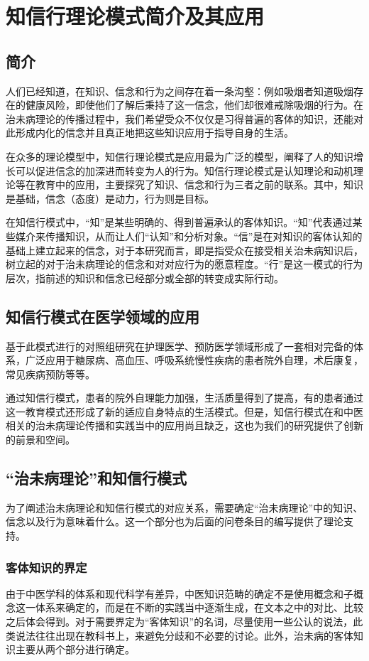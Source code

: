 \section{知信行理论模式简介及其应用}
\subsection{简介}
人们已经知道，在知识、信念和行为之间存在着一条沟壑：例如吸烟者知道吸烟存在的健康风险，即使他们了解后秉持了这一信念，他们却很难戒除吸烟的行为。在治未病理论的传播过程中，我们希望受众不仅仅是习得普遍的客体的知识，还能对此形成内化的信念并且真正地把这些知识应用于指导自身的生活。

在众多的理论模型中，知信行理论模式是应用最为广泛的模型，阐释了人的知识增长可以促进信念的加深进而转变为人的行为。知信行理论模式是认知理论和动机理论等在教育中的应用，主要探究了知识、信念和行为三者之前的联系。其中，知识是基础，信念（态度）是动力，行为则是目标。\cite{黄敬亨2006健康教育学}

在知信行模式中，“知”是某些明确的、得到普遍承认的客体知识。“知”代表通过某些媒介来传播知识，从而让人们“认知”和分析对象。“信”是在对知识的客体认知的基础上建立起来的信念，对于本研究而言，即是指受众在接受相关治未病知识后，树立起的对于治未病理论的信念和对对应行为的愿意程度。“行”是这一模式的行为层次，指前述的知识和信念已经部分或全部的转变成实际行动。\cite{金新政2003}

\subsection{知信行模式在医学领域的应用}基于此模式进行的对照组研究在护理医学、预防医学领域形成了一套相对完备的体系，广泛应用于糖尿病、高血压、呼吸系统慢性疾病的患者院外自理，术后康复，常见疾病预防等等。

通过知信行模式，患者的院外自理能力加强，生活质量得到了提高，有的患者通过这一教育模式还形成了新的适应自身特点的生活模式。但是，知信行模式在和中医相关的治未病理论传播和实践当中的应用尚且缺乏，这也为我们的研究提供了创新的前景和空间。

\subsection{“治未病理论”和知信行模式}
为了阐述治未病理论和知信行模式的对应关系，需要确定“治未病理论”中的知识、信念以及行为意味着什么。这一个部分也为后面的问卷条目的编写提供了理论支持。
\subsubsection{客体知识的界定}
由于中医学科的体系和现代科学有差异，中医知识范畴的确定不是使用概念和子概念这一体系来确定的，而是在不断的实践当中逐渐生成，在文本之中的对比、比较之后体会得到。对于需要界定为“客体知识”的名词，尽量使用一些公认的说法，此类说法往往出现在教科书上，来避免分歧和不必要的讨论。此外，治未病的客体知识主要从两个部分进行确定。

